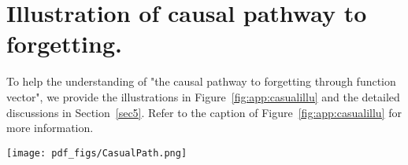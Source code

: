 \begin{algorithm}[H]

\caption{Function vector guided training procedure}
\end{algorithm} 




\section{Illustration of causal pathway to forgetting.}

To help the understanding of "the causal pathway to forgetting through function vector", we provide the illustrations in Figure~\ref{fig:app:casualillu} and the detailed discussions in Section~\ref{sec5}. Refer to the caption of Figure~\ref{fig:app:casualillu} for more information.


\begin{figure*}[h]
  \centering
  \texttt{[image: pdf\_figs/CasualPath.png]}
  \caption{Illustration of causal pathway to forgetting. In (a), the pre-trained model is expressed in a latent variable assumption. It assumes task $T_0$ establishes a predictive pathway (shown in orange) that aligns well with the task (high probability with $\theta_{T_0}^0$). In (b), it shows the model after learning a new task $T_1$ without regularization, which will necessarily update the function attention heads, i.e., $P_M(\theta|x)$, (shown in red blocks), producing new function vectors $\theta^1_{T_0}$ and $\theta^1_{T_1}$ that are biased toward $T_1$. These shifts in function vectors lead to a derailed predictive pathway (shown in purple) with erroneous predictions for task $T_0$; in other words, forgetting of $T_0$ occurs. In summary, the modifications in $P_M(\theta|x)$ rather than $P_M(y|x,\theta)$ are the primary driving force behind forgetting. }
  \label{fig:app:casualillu}
\end{figure*}


